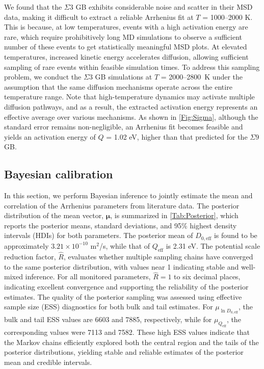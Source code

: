 \documentclass[%
preprint,
amsmath,amssymb,
aps,
]{revtex4-2}
\newcommand{\?}{\stackrel{?}{=}}
\begin{document}
We found that the $\Sigma 3$ GB exhibits considerable noise and scatter in their MSD data, making it difficult to extract a reliable Arrhenius fit at $T$ = 1000--2000 K. This is because, at low temperatures, events with a high activation energy are rare, which require prohibitively long MD simulations to observe a sufficient number of these events to get statistically meaningful MSD plots. At elevated temperatures, increased kinetic energy accelerates diffusion, allowing sufficient sampling of rare events within feasible simulation times. To address this sampling problem, we conduct the $\Sigma 3$ GB simulations at $T$ = 2000--2800~K under the assumption that the same diffusion mechanisms operate across the entire temperature range. Note that high-temperature dynamics may activate multiple diffusion pathways, and as a result, the extracted activation energy represents an effective average over various mechanisms. As shown in \cref{Fig:Sigma}, although the standard error remains non-negligible, an Arrhenius fit becomes feasible and yields an activation energy of $Q$ = 1.02 eV, higher than that predicted for the $\Sigma 9$ GB.


\subsection{Bayesian calibration}

In this section, we perform Bayesian inference to jointly estimate the mean and correlation of the Arrhenius parameters from literature data. The posterior distribution of the mean vector, $\boldsymbol{\mu}$, is summarized in \cref{Tab:Posterior}, which reports the posterior means, standard deviations, and 95\% highest density intervals (HDIs) for both parameters. The posterior mean of $D_{0,\text{eff}}$ is found to be approximately $3.21 \times 10^{-10}$ m$^2$/s, while that of $Q_\text{eff}$ is 2.31 eV. The potential scale reduction factor, $\hat{R}$, \cite{Gelman1992} evaluates whether multiple sampling chains have converged to the same posterior distribution, with values near 1 indicating stable and well-mixed inference. For all monitored parameters, $\hat{R} = 1$ to six decimal places, indicating excellent convergence and supporting the reliability of the posterior estimates. The quality of the posterior sampling was assessed using effective sample size (ESS) diagnostics \cite{Vehtarh2021} for both bulk and tail estimates. For $\mu_{\ln D_{0,\text{eff}}}$, the bulk and tail ESS values are 6603 and 7885, respectively, while for $\mu_{Q_\text{eff}}$, the corresponding values were 7113 and 7582. These high ESS values indicate that the Markov chains efficiently explored both the central region and the tails of the posterior distributions, yielding stable and reliable estimates of the posterior mean and credible intervals.
\end{document}

